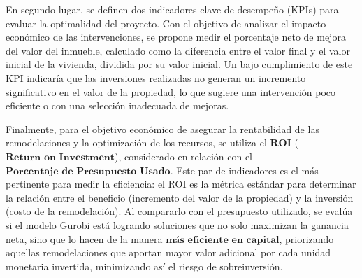 En segundo lugar, se definen dos indicadores clave de desempeño (KPIs) para evaluar la optimalidad del proyecto. Con el objetivo de analizar el impacto económico de las intervenciones, se propone medir el porcentaje neto de mejora del valor del inmueble, calculado como la diferencia entre el valor final y el valor inicial de la vivienda, dividida por su valor inicial. Un bajo cumplimiento de este KPI indicaría que las inversiones realizadas no generan un incremento significativo en el valor de la propiedad, lo que sugiere una intervención poco eficiente o con una selección inadecuada de mejoras.

Finalmente, para el objetivo económico de asegurar la rentabilidad de las remodelaciones y la optimización de los recursos, se utiliza el $\mathbf{\text{ROI}}$ ($\mathbf{\text{Return on Investment}}$), considerado en relación con el $\mathbf{\text{Porcentaje de Presupuesto Usado}}$. Este par de indicadores es el más pertinente para medir la eficiencia: el ROI es la métrica estándar para determinar la relación entre el beneficio (incremento del valor de la propiedad) y la inversión (costo de la remodelación). Al compararlo con el presupuesto utilizado, se evalúa si el modelo Gurobi está logrando soluciones que no solo maximizan la ganancia neta, sino que lo hacen de la manera $\mathbf{\text{más eficiente en capital}}$, priorizando aquellas remodelaciones que aportan mayor valor adicional por cada unidad monetaria invertida, minimizando así el riesgo de sobreinversión.\\


